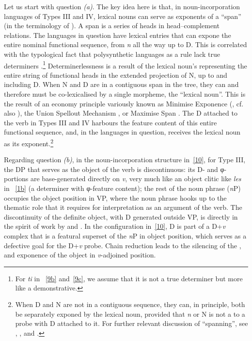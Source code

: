 \documentclass[output=paper]{langsci/langscibook}
\begin{document}
\begin{refcontext}
\vspace{1ex}

Let us start with question \emph{(a)}. The key idea here is that, in
noun-incorporation languages of Types III and IV, lexical nouns can serve as
exponents of a \enquote{span} (in the terminology of ).  A span is a
series of heads in head--complement relations. The languages in question have
lexical entries that can expone the entire nominal functional sequence, from
\emph{n} all the way up to D.  This is correlated with the typological fact
that polysynthetic languages as a rule lack true determiners
\citep{baker96}.\footnote{For \emph{ti} in ~\eqref{9b} and~\eqref{9c}, we
assume that it is not a true determiner but more like a demonstrative.}
Determinerlessness is a result of the lexical noun's representing the entire
string of functional heads in the extended projection of N, up to and including
D. When N and D are in a contiguous span in the tree, they can and therefore
must be co-lexicalised by a single morpheme, the \enquote{lexical noun}. This is the
result of an economy principle variously known as Minimise Exponence
(\citealt{siddiqi}, cf. also \citealt{noyer93}), the Union Spellout Mechanism
\citep{muriungiunionspo}, or Maximise Span \citep{pantchevalocationsourcegoal}.
The D attached to the verb in Types III and IV harbours the feature content of
this entire functional sequence, and, in the languages in question, receives
the lexical noun as its exponent.\footnote{When D and N are not in a contiguous
    sequence, they can, in principle, both be separately exponed by the lexical
    noun, provided that \emph{n} or N is not a  to a probe with D
attached to it. For further relevant discussion of \enquote{spanning}, see
\citet{ramchand08}, \citet{taraldnguni}, \citet{merchant15} and
\citet{svenonius16}.}

Regarding question \emph{(b)}, in the noun-incorporation structure
in~\eqref{10}, for Type III, the DP that serves as the object of the verb is
discontinuous: its D- and φ{}-portions are base-generated directly on \emph{v},
very much like an object clitic like \emph{les} in ~\eqref{1b} (a
determiner with φ-feature content); the rest of the noun phrase (\emph{n}P)
occupies the object position in VP, where the noun phrase hooks up to the
thematic role that it requires for interpretation as an argument of the verb.
The discontinuity of the definite object, with D generated outside VP, is
directly in the spirit of work by \citet{sportiche98} and \citet{lin00}. In the
configuration in~\eqref{10}, D is part of a D+\emph{v} complex that is a
featural superset of the \emph{n}P in object position, which serves as a
defective goal for the D+\emph{v} probe.  Chain reduction leads to the
silencing of the , and exponence of the object in
\emph{v}-adjoined position.


\end{refcontext}
\end{document}
